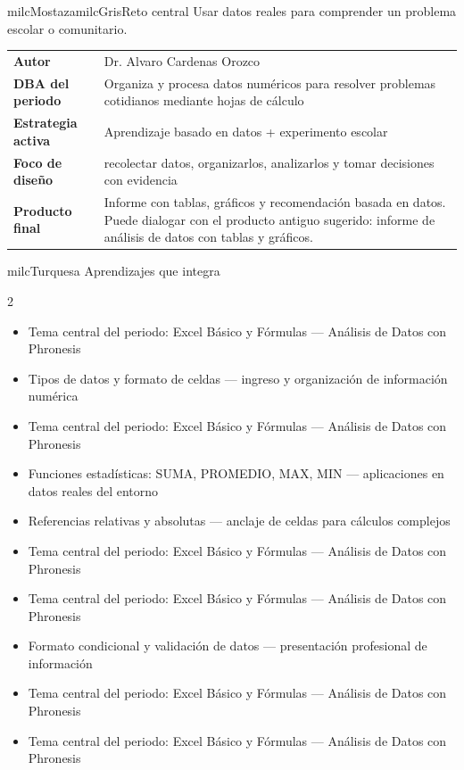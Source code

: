 \documentclass[11pt,letterpaper]{article}
\begin{document}
\begin{softbox}{milcMostaza}{milcGris}{Reto central}
Usar datos reales para comprender un problema escolar o comunitario.
\end{softbox}

\begin{tabularx}{\textwidth}{>{\bfseries}p{3.4cm}X}
\rowcolor{milcMagenta!12}Autor & Dr. Alvaro Cardenas Orozco\\
DBA del periodo & Organiza y procesa datos numéricos para resolver problemas cotidianos mediante hojas de cálculo\\
Estrategia activa & Aprendizaje basado en datos + experimento escolar\\
Foco de diseño & recolectar datos, organizarlos, analizarlos y tomar decisiones con evidencia\\
Producto final & Informe con tablas, gráficos y recomendación basada en datos. Puede dialogar con el producto antiguo sugerido: informe de análisis de datos con tablas y gráficos.\\
\end{tabularx}

\begin{titlebox}{milcTurquesa}
Aprendizajes que integra
\end{titlebox}
\begin{multicols}{2}
\begin{itemize}[leftmargin=*]
\item Tema central del periodo: Excel Básico y Fórmulas — Análisis de Datos con Phronesis
\item Tipos de datos y formato de celdas — ingreso y organización de información numérica
\item Tema central del periodo: Excel Básico y Fórmulas — Análisis de Datos con Phronesis
\item Funciones estadísticas: SUMA, PROMEDIO, MAX, MIN — aplicaciones en datos reales del entorno
\item Referencias relativas y absolutas — anclaje de celdas para cálculos complejos
\item Tema central del periodo: Excel Básico y Fórmulas — Análisis de Datos con Phronesis
\item Tema central del periodo: Excel Básico y Fórmulas — Análisis de Datos con Phronesis
\item Formato condicional y validación de datos — presentación profesional de información
\item Tema central del periodo: Excel Básico y Fórmulas — Análisis de Datos con Phronesis
\item Tema central del periodo: Excel Básico y Fórmulas — Análisis de Datos con Phronesis
\end{itemize}
\end{multicols}
\end{document}
